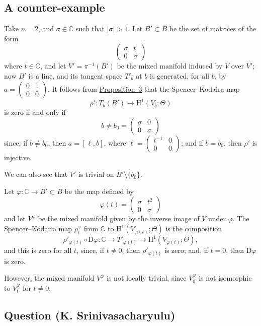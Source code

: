 \documentclass{article}
\newcommand{\CC}{\mathbb{C}}
\newcommand{\DD}{\mathrm{D}}
\newcommand{\HH}{\mathrm{H}}
\newcommand{\oldpage}[1]{\marginpar{\footnotesize$\Big\vert$ \textit{p.~#1}}}
\begin{document}
\subsection{A counter-example}
\label{III.4}

Take $n=2$, and $\sigma\in\CC$ such that $|\sigma|>1$.
Let $B'\subset B$ be the set of matrices of the form
\[
  \begin{pmatrix}
    \sigma & t
  \\0 & \sigma
  \end{pmatrix}
\]
where $t\in\CC$, and let $V'=\pi^{-1}(B')$ be the mixed manifold induced by $V$ over $V'$;
now $B'$ is a line, and its tangent space $T'_b$ at $b$ is generated, for all $b$, by $a=\begin{pmatrix}0&1\\0&0\end{pmatrix}$.
It follows from \hyperref[proposition3]{Proposition~3} that the Spencer--Kodaira map
\[
  \rho'\colon T_b(B') \to \HH^1(V_b;\Theta)
\]
is zero if and only if
\[
  b \neq b_0 =
  \begin{pmatrix}
    \sigma & 0
  \\0 & \sigma
  \end{pmatrix}
\]
since, if $b\neq b_0$, then $a=[\ell,b]$, where $\ell=\begin{pmatrix}t^{-1}&0\\0&0\end{pmatrix}$; and if $b=b_0$, then $\rho'$ is injective.

We can also see that $V'$ is trivial on $B'\setminus\{b_0\}$.

Let $\varphi\colon\CC\to B'\subset B$ be the map defined by
\[
  \varphi(t) =
  \begin{pmatrix}
    \sigma & t^2
  \\0 & \sigma
  \end{pmatrix}
\]
and let $V^\varphi$ be the mixed manifold given by the inverse image of $V$ under $\varphi$.
The Spencer--Kodaira map $\rho_t^\varphi$ from $\CC$ to $\HH^1(V_{\varphi(t)};\Theta)$ is the composition
\oldpage{3-08}
\[
  \rho'_{\varphi(t)}\circ\DD\varphi\colon
  \CC
  \to T'_{\varphi(t)}
  \to \HH^1(V_{\varphi(t)};\Theta),
\]
and this is zero for all $t$, since, if $t\neq0$, then $\rho'_{\varphi(t)}$ is zero; and, if $t=0$, then $\DD\varphi$ is zero.

However, the mixed manifold $V^\varphi$ is not locally trivial, since $V_0^\varphi$ is not isomorphic to $V_t^\varphi$ for $t\neq0$.


\subsection{Question (K. Srinivasacharyulu)}
\label{III.5}
\end{document}
